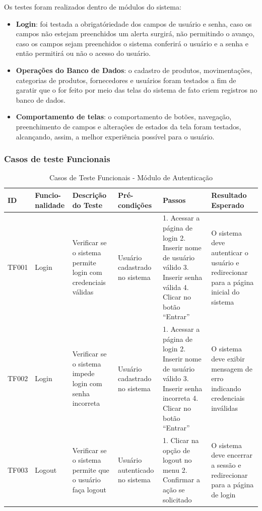 \documentclass[
	12pt,				%
	openany,			%
	twoside,			%
	a4paper,			%
	english,			%
	brazil				%
	]{abntex2}
\begin{document}
Os testes foram realizados dentro de módulos do sistema:

\begin{itemize}
    \item \textbf{Login}: foi testada a obrigatóriedade dos campos de usuário e senha, caso os campos não estejam preenchidos um alerta surgirá, não permitindo o avanço, caso os campos sejam preenchidos o sistema conferirá o usuário e a senha e então permitirá ou não o acesso do usuário.
    \item \textbf{Operações do Banco de Dados}: o cadastro de produtos, movimentações, categorias de produtos, fornecedores e usuários foram testados a fim de garatir que o for feito por meio das telas do sistema de fato criem registros no banco de dados.
    \item \textbf{Comportamento de telas}: o comportamento de botões, navegação, preenchimento de campos e alterações de estados da tela foram testados, alcançando, assim, a melhor experiência possível para o usuário.
\end{itemize}

\newpage

\subsubsection{Casos de teste Funcionais}
\begin{table}[htbp]

\caption{Casos de Teste Funcionais - Módulo de Autenticação}
\begin{tabular}{|p{1cm}|p{1.4cm}|p{3.3cm}|p{2.3cm}|p{3.5cm}|p{3.5cm}|}
\hline
\textbf{ID} & \textbf{Funcio-nalidade} & \textbf{Descrição do Teste} & \textbf{Pré-condições} & \textbf{Passos} & \textbf{Resultado Esperado} \\
\hline
TF001 & Login & Verificar se o sistema permite login com credenciais válidas & Usuário cadastrado no sistema & 
1. Acessar a página de login
2. Inserir nome de usuário válido
3. Inserir senha válida
4. Clicar no botão ``Entrar'' & 
O sistema deve autenticar o usuário e redirecionar para a página inicial do sistema \\
\hline
TF002 & Login & Verificar se o sistema impede login com senha incorreta & Usuário cadastrado no sistema & 
1. Acessar a página de login
2. Inserir nome de usuário válido
3. Inserir senha incorreta
4. Clicar no botão ``Entrar'' & 
O sistema deve exibir mensagem de erro indicando credenciais inválidas \\
\hline
TF003 & Logout & Verificar se o sistema permite que o usuário faça logout & Usuário autenticado no sistema & 
1. Clicar na opção de logout no menu
2. Confirmar a ação se solicitado & 
O sistema deve encerrar a sessão e redirecionar para a página de login \\
\hline
\end{tabular}
\end{table}
\end{document}
